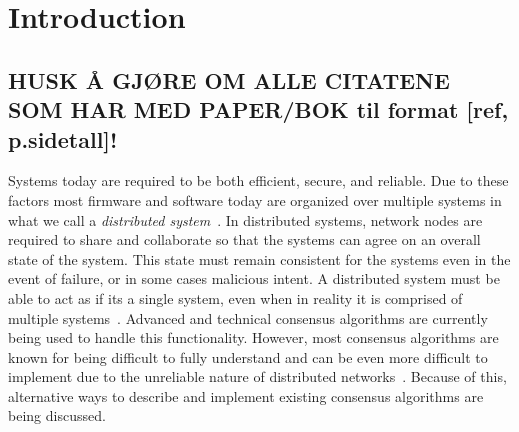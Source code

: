 \chapter{Introduction}
\section*{HUSK Å GJØRE OM ALLE CITATENE SOM HAR MED PAPER/BOK til format [ref, p.sidetall]!}
Systems today are required to be both efficient, secure, and reliable. Due to these factors most firmware and software today are organized over multiple systems in what we call a \textit{distributed system}~\cites{WEB:DistSys}[p.~16]{BOOK:MVstandver3}. In distributed systems, network nodes are required to share and collaborate so that the systems can agree on an overall state of the system. This state must remain consistent for the systems even in the event of failure, or in some cases malicious intent. A distributed system must be able to act as if its a single system, even when in reality it is comprised of multiple systems~\cite[p.~18]{BOOK:MVstandver3}. Advanced and technical consensus algorithms are currently being used to handle this functionality. 
However, most consensus algorithms are known for being difficult to fully understand and can be even more difficult to implement due to the unreliable nature of distributed networks~\cites[p.~459]{BOOK:MVstandver3}[p.~13]{PAPER:EivindPaper}. Because of this, alternative ways to describe and implement existing consensus algorithms are being discussed.



